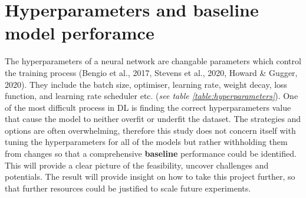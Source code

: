 \documentclass[11pt, a4paper, twoside]{report}
\begin{document}
\section{Hyperparameters and baseline model perforamce}

The hyperparameters of a neural network are changable parameters which control the training process (Bengio et al., 2017, Stevens et al., 2020, Howard \& Gugger, 2020). They include the batch size, optimiser, learning rate, weight decay, loss function, and learning rate scheduler etc. (\textit{see table \ref{table:hyperparameters}}). One of the most difficult process in DL is finding the correct hyperparameters value that cause the model to neither overfit or underfit the dataset. The strategies and options are often overwhelming, therefore this study does not concern itself with tuning the hyperparameters for all of the models but rather withholding them from changes so that a comprehensive \textbf{baseline} performance could be identified. This will provide a clear picture of the feasibility, uncover challenges and potentials. The result will provide insight on how to take this project further, so that further resources could be justified to scale future experiments.\\\par
\end{document}
